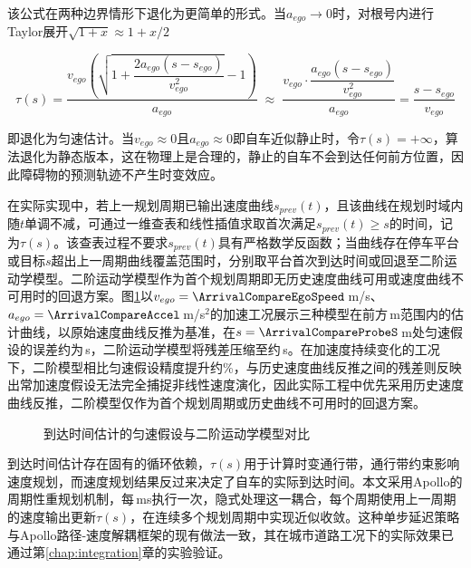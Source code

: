 该公式在两种边界情形下退化为更简单的形式。当$a_{ego} \to 0$时，对根号内进行Taylor展开$\sqrt{1 + x} \approx 1 + x/2$

\begin{equation}
    \tau(s) = \frac{v_{ego}\!\left(\sqrt{1 + \dfrac{2a_{ego}(s-s_{ego})}{v_{ego}^2}} - 1\right)}{a_{ego}} \;\approx\; \frac{v_{ego} \cdot \dfrac{a_{ego}(s-s_{ego})}{v_{ego}^2}}{a_{ego}} = \frac{s - s_{ego}}{v_{ego}}
    \label{eq:arrival_time_degenerate}
\end{equation}

即退化为匀速估计。当$v_{ego} \approx 0$且$a_{ego} \approx 0$即自车近似静止时，令$\tau(s) = +\infty$，算法退化为静态版本，这在物理上是合理的，静止的自车不会到达任何前方位置，因此障碍物的预测轨迹不产生时变效应。

在实际实现中，若上一规划周期已输出速度曲线$s_{prev}(t)$，且该曲线在规划时域内随$t$单调不减，可通过一维查表和线性插值求取首次满足$s_{prev}(t)\geq s$的时间，记为$\tau(s)$。该查表过程不要求$s_{prev}(t)$具有严格数学反函数；当曲线存在停车平台或目标$s$超出上一周期曲线覆盖范围时，分别取平台首次到达时间或回退至二阶运动学模型。二阶运动学模型作为首个规划周期即无历史速度曲线可用或速度曲线不可用时的回退方案。图\ref{fig:arrival_time_compare}以$v_{ego}=\ArrivalCompareEgoSpeed$\,m/s、$a_{ego}=\ArrivalCompareAccel$\,m/s$^2$的加速工况展示三种模型在前方\ArrivalCompareRange\,m范围内的估计曲线，以原始速度曲线反推为基准，在$s=\ArrivalCompareProbeS$\,m处匀速假设的误差约为\ArrivalCompareUniformError\,s，二阶运动学模型将残差压缩至约\ArrivalCompareSecondOrderError\,s。在加速度持续变化的工况下，二阶模型相比匀速假设精度提升约\ArrivalCompareImprovementPct\%，与历史速度曲线反推之间的残差则反映出常加速度假设无法完全捕捉非线性速度演化，因此实际工程中优先采用历史速度曲线反推，二阶模型仅作为首个规划周期或历史曲线不可用时的回退方案。

\begin{figure}[htbp]
\centering
{}
\caption{到达时间估计的匀速假设与二阶运动学模型对比}
\label{fig:arrival_time_compare}
\end{figure}

到达时间估计存在固有的循环依赖，$\tau(s)$用于计算时变通行带，通行带约束影响速度规划，而速度规划结果反过来决定了自车的实际到达时间。本文采用Apollo的周期性重规划机制，每\PlannerCycleMs\,ms执行一次，隐式处理这一耦合，每个周期使用上一周期的速度输出更新$\tau(s)$，在连续多个规划周期中实现近似收敛。这种单步延迟策略与Apollo路径-速度解耦框架的现有做法一致，其在城市道路工况下的实际效果已通过第\ref{chap:integration}章的实验验证。

